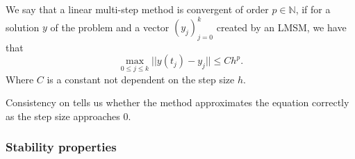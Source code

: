 	\begin{frame}
		\vfill
		\begin{definition} \label{def: LMSM convergence}
			We say that a linear multi-step method is convergent of order $p \in \mathbb{N}$, if for a solution $y$ of the problem and a vector $(y_j)_{j=0}^k$ created by an LMSM, we have that
			\begin{displaymath}
				\max_{0 \leq j \leq k} ||y(t_j) - y_j|| \leq Ch^p.
			\end{displaymath}
			Where $C$ is a constant not dependent on the step size $h$.
		\end{definition}
		
		Consistency on tells us whether the method approximates the equation correctly as the step size approaches $0$.
		
		\vfill
	\end{frame}
	
	
	\subsubsection*{Stability properties}
	
